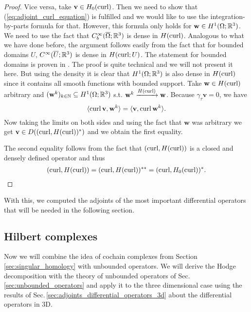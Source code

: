 \documentclass[../master_thesis.tex]{subfiles}
\begin{document}
\begin{proof}
    Vice versa, take $\mathbf{v} \in H_0(\operatorname{curl})$. Then we need to show that 
    (\ref{eq:adjoint_curl_equation}) is fulfilled and we would like to use the integration-by-parts formula 
    for that. However, this formula only holds for $\mathbf{w} \in H^1(\Omega;\mathbb{R}^3)$. 
    We need to use the fact that $C_b^\infty(\overline{\Omega};\mathbb{R}^3)$ is 
    dense in $H(\operatorname{curl})$. Analogous to what we have done before, the argument follows easily from the fact that 
    for bounded domains $U$, $C^\infty(\overline{U};\mathbb{R}^3)$ is dense in $H(\operatorname{curl};U)$. 
    The statement for bounded domains is proven in \cite[Lemma 3.27]{monk}. 
    The proof is quite technical 
    and we will not present it here. But using the density it is clear that 
    $H^1(\Omega;\mathbb{R}^3)$ is also dense in $H(\operatorname{curl})$ since it contains all smooth functions 
    with bounded support. Take $\mathbf{w} \in H(\operatorname{curl})$ arbitrary and 
    $(\mathbf{w}^k)_{k \in \mathbb{N}} \subseteq H^1(\Omega;\mathbb{R}^3)$
    s.t. $\mathbf{w}^k \xrightarrow{H(\operatorname{curl})} \mathbf{w}$.
    Because $\gamma_\tau \mathbf{v} = 0$, we have 
    \begin{align*}
        \langle \operatorname{curl} \mathbf{v}, \mathbf{w}^k \rangle
        = \langle \mathbf{v}, \operatorname{curl} \mathbf{w}^k \rangle.
    \end{align*}
    Now taking the limits on both sides and using the fact that $\mathbf{w}$ was 
    arbitrary we get $\mathbf{v} \in D((\operatorname{curl}, H(\operatorname{curl}))^*)$ and 
    we obtain the first equality. 

    The second equality follows from the fact that $(\operatorname{curl}, H(\operatorname{curl}))$ is 
    a closed and densely defined operator and thus 
    \begin{align*}
        (\operatorname{curl}, H(\operatorname{curl}))= (\operatorname{curl}, H(\operatorname{curl}))^{**} = (\operatorname{curl}, H_0(\operatorname{curl}))^*.
    \end{align*}
\end{proof}
With this, we computed the adjoints of the most important differential operators that 
will be needed in the following section. 

\subsection{Hilbert complexes}\label{sec:hilbert_complexes_subsection}

Now we will combine the idea of cochain complexes from Section 
\ref{sec:singular_homology} 
with unbounded operators. We will  
derive the Hodge decomposition with the theory of unbounded operators of 
Sec.\,\ref{sec:unbounded_operators} and apply it to the three dimensional case
using the results of Sec.\,\ref{sec:adjoints_differential_operators_3d} about the 
differential operators in 3D.
\end{document}
